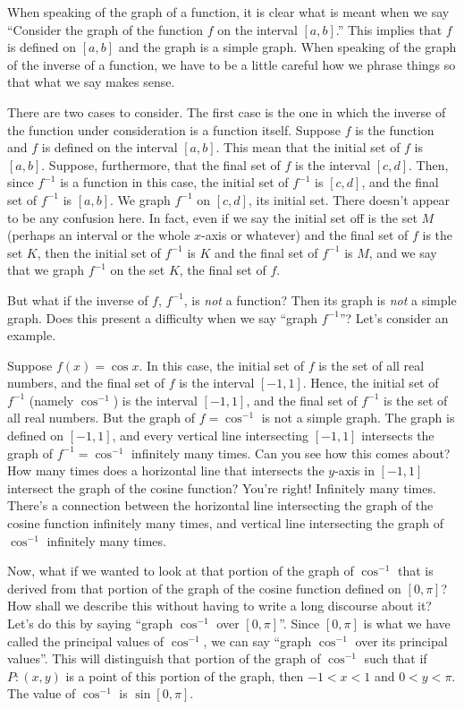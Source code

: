 \documentclass[english]{book}
\begin{document}
\vspace{0.3cm}

When speaking of the graph of a function, it is clear what is meant when we say ``Consider the graph of the function $f$ on the interval $[a,b]$.'' This implies that $f$ is defined on $[a,b]$ and the graph is a simple graph. When speaking of the graph of the inverse of a function, we have to be a little careful how we phrase things so that what we say makes sense.

There are two cases to consider. The first case is the one in which the inverse of the function under consideration is a function itself. Suppose $f$ is the function and $f$ is defined on the interval $[a,b]$. This mean that the initial set of $f$ is $[a,b]$. Suppose, furthermore, that the final set of $f$ is the interval $[c,d]$. Then, since $f^{-1}$ is a function in this case, the initial set of $f^{-1}$ is $[c,d]$, and the final set of $f^{-1}$ is $[a,b]$. We graph $f^{-1}$ on $[c,d]$, its initial set. There doesn't appear to be any confusion here. In fact, even if we say the initial set off is the set $M$ (perhaps an interval or the whole $x$-axis or whatever) and the final set of $f$ is the set $K$, then the initial set of $f^{-1}$ is $K$ and the final set of $f^{-1}$ is $M$, and we say that we graph $f^{-1}$ on the set $K$, the final set of $f$.

But what if the inverse of $f$, $f^{-1}$, is \emph{not} a function? Then its graph is \emph{not} a simple graph. Does this present a difficulty when we say ``graph $f^{-1}$''? Let's consider an example. 

Suppose $f(x) = \cos x$. In this case, the initial set of $f$ is the set of all real numbers, and the final set of $f$ is the interval $[-1,1]$. Hence, the initial set of $f^{-1}$ (namely $\cos^{-1}$) is the interval $[-1,1]$, and the final set of $f^{-1}$ is the set of all real numbers. But the graph of $f = \cos^{-1}$ is not a simple graph. The graph is defined on $[-1,1]$, and every vertical line intersecting $[-1,1]$ intersects the graph of $f^{-1} = \cos^{-1}$ infinitely many times. Can you see how this comes about? How many times does a horizontal line that intersects the $y$-axis in $[-1,1]$ intersect the graph of the cosine function? You're right! Infinitely many times. There's a connection between the horizontal line intersecting the graph of the cosine function infinitely many times, and vertical line intersecting the graph of $\cos^{-1}$ infinitely many times. 

Now, what if we wanted to look at that portion of the graph of $\cos^{-1}$ that is derived from that portion of the graph of the cosine function defined on $[0,\pi]$? How shall we describe this without having to write a long discourse about it? Let's do this by saying ``graph $\cos^{-1}$ over $[0,\pi]$''. Since $[0,\pi]$ is what we have called the principal values of $\cos^{-1}$, we can say ``graph $\cos^{-1}$ over its principal values''. This will distinguish that portion of the graph of $\cos^{-1}$ such that if $P:(x,y)$ is a point of this portion of the graph, then $-1<x<1$ and $0<y<\pi$. The value of $\cos^{-1}$ is $\sin[0,\pi]$.
\end{document}
